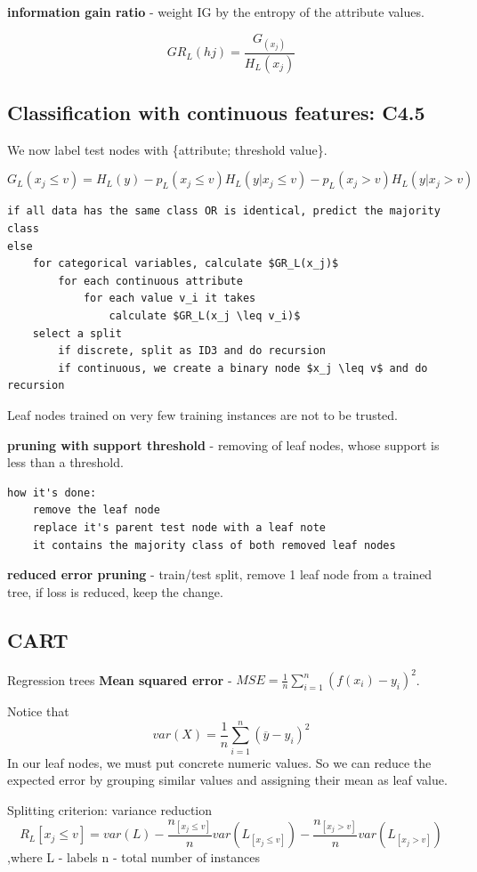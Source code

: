 \documentclass{article}
\newcommand{\para}[0]{\par\vspace{0.2cm}\noindent}
\newcommand{\define}[2]{\textbf{#1} - {#2}.  \para}
\begin{document}
\define{information gain ratio}
           {weight IG by the entropy of the attribute values}
$$ GR_L(hj) = \frac{G_(x_j)}{H_L(x_j)} $$


\subsection{Classification with continuous features: C4.5}
We now label test nodes with \{attribute; threshold value\}.

$$ G_L(x_j \leq v) = H_L(y) - p_L(x_j \leq v) H_L(y|x_j \leq v) - p_L(x_j > v) H_L(y|x_j > v)$$

\begin{verbatim}
if all data has the same class OR is identical, predict the majority class
else
    for categorical variables, calculate $GR_L(x_j)$
        for each continuous attribute
            for each value v_i it takes
                calculate $GR_L(x_j \leq v_i)$
    select a split
        if discrete, split as ID3 and do recursion
        if continuous, we create a binary node $x_j \leq v$ and do recursion
\end{verbatim}

Leaf nodes trained on very few training instances are not to be trusted.

\define{pruning with support threshold}
           {removing of leaf nodes, whose support is less than a threshold}

\begin{verbatim}
how it's done:
    remove the leaf node
    replace it's parent test node with a leaf note
    it contains the majority class of both removed leaf nodes
\end{verbatim}

\define{reduced error pruning}
           {train/test split, remove 1 leaf node from a trained tree, if loss is reduced, keep the change}


\subsection{CART}
Regression trees
\define{Mean squared error}
           {$MSE = \frac{1}{n} \sum_{i=1}^n (f(x_i) - y_i)^2$}

Notice that
$$ var(X) = \frac{1}{n} \sum_{i=1}^n (\overline y - y_i)^2$$
In our leaf nodes, we must put concrete numeric values.
So we can reduce the expected error by grouping similar values and assigning their mean as leaf value. 

Splitting criterion: variance reduction
$$ R_L[x_j \leq v] = var(L) - \frac{n_{[x_j \leq v]}}{n} var(L_{[x_j \leq v]})
                            - \frac{n_{[x_j > v]}}{n} var(L_{[x_j > v]})$$
,where L - labels
n - total number of instances
\end{document}
